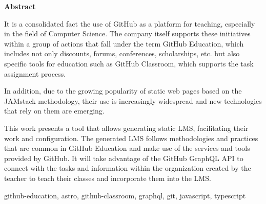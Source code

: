 \documentclass[spanish,a4paper,12pt,oneside]{extreport}
\newenvironment{summary}
{\par\noindent\begin{center}\textbf{Abstract}\end{center}\begin{itshape}\par\noindent}
{\end{itshape}}
\newenvironment{keywords}
{\begin{list}{}{\setlength{\leftmargin}{1em}}\item[\hskip\labelsep \bfseries Keywords:]}
{\end{list}}
\begin{document}
\begin{summary}
It is a consolidated fact the use of GitHub as a platform for teaching, especially in the field of Computer Science.
The company itself supports these initiatives within a group of actions that fall under the term GitHub Education,
which includes not only discounts, forums, conferences, scholarships, etc. but also specific tools for
education such as GitHub Classroom, which supports the task assignment process.

In addition, due to the growing popularity of static web pages based on the JAMstack methodology,
their use is increasingly widespread and new technologies that rely on them are emerging.

This work presents a tool that allows generating static LMS, facilitating their work and configuration.
The generated LMS follows methodologies and practices that are common in GitHub Education and
make use of the services and tools provided by GitHub. It will take advantage of the GitHub GraphQL API
to connect with the tasks and information within the organization created by the teacher to teach
their classes and incorporate them into the LMS.
\begin {keywords}
github-education, astro, github-classroom, graphql, git, javascript, typescript
\end {keywords}

\end{summary}
\newpage{\pagestyle{empty}}
\thispagestyle{empty}

\pagestyle{myheadings} %



\renewcommand{\thepage}{\roman{page}}
\setcounter{page}{1}
\pagestyle{plain} 


{\hypersetup{linkcolor=black}
\tableofcontents

\newpage{\pagestyle{empty}}

\listoffigures

\newpage{\pagestyle{empty}}

\listoftables
}
\end{document}
